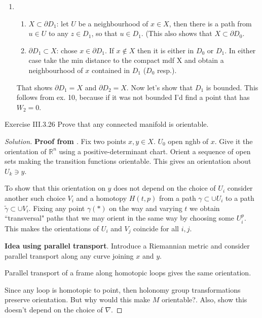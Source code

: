 \begin{enumerate}[label=\textbf{Step \arabic*}]
	\item 
		\begin{enumerate}
		\item \(X \subset \partial D_1\): let \(U\) be a neighbourhood of \(x \in X\), then there is a path from \(u \in U\) to any \(z \in D_1\), so that \(u \in D_1\). (This also shows that \( X \subset \partial D_0\).
		\item \(\partial D_1 \subset X\): chose \(x \in \partial D_1\). If \(x \not \in X\) then it is either in \(D_0\) or \(D_1\). In either case take the min distance to the compact mdf X and obtain a neighbourhood of \(x\) contained in \(D_1\) (\(D_0\) resp.).
		\end{enumerate}
		That shows \(\partial D_1=X\) and \(\partial D_2=X\). Now let's show that \(D_1\) is bounded. This follows from ex. 10, because if it was not bounded I'd find a point that has \(W_2=0\).
\end{enumerate}

\begin{thing4}{Exercise III.3.26}\label{exer:III.3.26}\leavevmode
Prove that any connected manifold is orientable.
\end{thing4}

\begin{proof}[Solution]\leavevmode
\textbf{Proof from \cite{gui}}. Fix two points \(x, y \in X\). \(U_0\) open nghb of \(x\). Give it the orientation of \(\mathbb{R}^n\) using a positive-determinant chart. Orient a sequence of open sets making the transition functions orientable. This gives an orientation about \(U_k \ni y\).

To show that this orientation on \(y\) does not depend on the choice of \(U_i\) consider another such choice \(V_i\) and a homotopy \(H(t,p)\) from  a path \(\gamma \subset \cup U_i\) to a path \(\tilde{\gamma}\subset \cup V_i\). Fixing any point \(\gamma(*)\) on the way and varying \(t \) we obtain ``transversal" paths that we may orient in the same way by choosing some \(U_i^p\). This makes the orientations of \(U_i\) and \(V_j\) coincide for all \(i,j\).

\textbf{Idea using parallel transport}. Introduce a Riemannian metric and consider parallel transport along any curve joining \(x\) and \(y\).

\begin{claim}\leavevmode
Parallel transport of a frame along homotopic loops gives the same orientation.
\end{claim}
Since any loop is homotopic to point, then holonomy group transformations preserve orientation. {\color{6}But why would this make \(M\) orientable?}. Also, {\color{6}show this doesn't depend on the choice of \( \nabla\).}
\end{proof}















